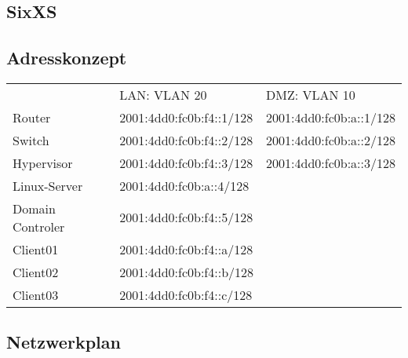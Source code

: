 \subsection{SixXS}

\subsection{Adresskonzept}

\begin{tabular}{|l|l|l|}
\hline
					& LAN: VLAN 20					& DMZ: VLAN 10 \\
Router				& 2001:4dd0:fc0b:f4::1/128		& 2001:4dd0:fc0b:a::1/128 \\
Switch				& 2001:4dd0:fc0b:f4::2/128		& 2001:4dd0:fc0b:a::2/128 \\
Hypervisor			& 2001:4dd0:fc0b:f4::3/128		& 2001:4dd0:fc0b:a::3/128 \\	
Linux-Server											& 2001:4dd0:fc0b:a::4/128 \\
Domain Controler 	& 2001:4dd0:fc0b:f4::5/128		& \\
Client01				& 2001:4dd0:fc0b:f4::a/128		& \\
Client02				& 2001:4dd0:fc0b:f4::b/128		& \\
Client03				& 2001:4dd0:fc0b:f4::c/128		& \\
\hline
\end{tabular}

\subsection{Netzwerkplan}


